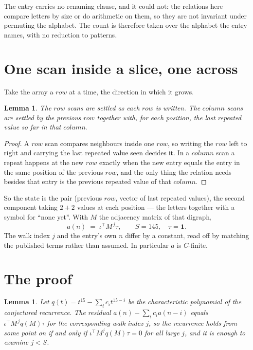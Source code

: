 \documentclass[11pt,a4paper]{article}
\theoremstyle{plain}
\newtheorem{lemma}[theorem]{Lemma}
\theoremstyle{definition}
\begin{document}
The entry carries no renaming clause, and it could not: the relations here compare letters by
size or do arithmetic on them, so they are not invariant under permuting the alphabet. The
count is therefore taken over the alphabet the entry names, with no reduction to patterns.

\section{One scan inside a slice, one across}

Take the array a $row$ at a time, the direction in which it grows.

\begin{lemma}\label{lem:state}
The $row$ scans are settled as each $row$ is written. The $column$ scans are
settled by the previous $row$ together with, for each position, the last repeated value
so far in that $column$.
\end{lemma}

\begin{proof}
A $row$ scan compares neighbours inside one $row$, so writing the
$row$ left to right and carrying the last repeated value seen decides it. In a
$column$ scan a repeat happens at the new $row$ exactly when the new entry equals the
entry in the same position of the previous $row$, and the only thing the relation needs
besides that entry is the previous repeated value of that $column$.
\end{proof}

So the state is the pair (previous $row$, vector of last repeated values), the second
component taking $2+2$ values at each position --- the letters together with a symbol for
``none yet''. With $M$ the adjacency matrix of that digraph,
\[
a(n)\;=\;\iota^{\!\top}M^{\,j}\tau ,\qquad S=145,\quad\tau=\mathbf{1} .
\]
The walk index $j$ and the entry's own $n$ differ by a constant, read off by matching the
published terms rather than assumed. In particular $a$ is $C$-finite.

\section{The proof}

\begin{lemma}\label{lem:crit}
Let $q(t)=t^{15}-\sum_i c_it^{15-i}$ be the characteristic polynomial of the
conjectured recurrence. The residual $a(n)-\sum_ic_ia(n-i)$ equals
$\iota^{\!\top}M^{\,j}q(M)\tau$ for the corresponding walk index $j$, so the recurrence
holds from some point on if and only if $\iota^{\!\top}M^{j}q(M)\tau=0$ for all large $j$,
and it is enough to examine $j<S$.
\end{lemma}
\end{document}
